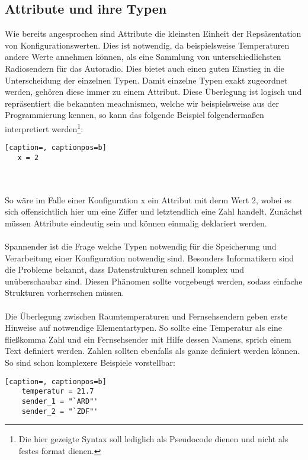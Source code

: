 \subsection{Attribute und ihre Typen}
Wie bereits angesprochen sind Attribute die kleinsten Einheit der Repsäsentation von Konfigurationswerten. Dies ist notwendig, da beispielsweise Temperaturen andere Werte annehmen können, als eine Sammlung von unterschiedlichsten Radiosendern für das Autoradio. Dies bietet auch einen guten Einstieg in die Unterscheidung der einzelnen Typen. Damit einzelne Typen exakt zugeordnet werden, gehören diese immer zu einem Attribut. Diese Überlegung ist logisch und repräsentiert die bekannten meachnismen, welche wir beispielsweise aus der Programmierung kennen, so kann das folgende Beispiel folgendermaßen interpretiert werden\footnote{Die hier gezeigte Syntax soll lediglich als Pseudocode dienen und nicht als festes format dienen.}:
\lstset{language=bash}
\begin{lstlisting}[caption=, captionpos=b]
   x = 2
\end{lstlisting}
	
\\\\

So wäre im Falle einer Konfiguration x ein Attribut mit derm Wert 2, wobei es sich offensichtlich hier um eine Ziffer und letztendlich eine Zahl handelt. Zunächst müssen Attribute eindeutig sein und können einmalig deklariert werden. 
\\\\
Spannender ist die Frage welche Typen notwendig für die  Speicherung und Verarbeitung einer Konfiguration notwendig sind. Besonders Informatikern sind die Probleme bekannt, dass Datenstrukturen schnell komplex und unüberschaubar sind. Diesen Phänomen sollte vorgebeugt werden, sodass einfache Strukturen vorherrschen müssen. 
\\\\
Die Überlegung zwischen Raumtemperaturen und Fernsehsendern geben erste Hinweise auf notwendige Elementartypen. So sollte eine Temperatur als eine fließkomma Zahl und ein Fernsehsender mit Hilfe dessen Namens, sprich einem Text definiert werden. Zahlen sollten ebenfalls als ganze definiert werden können. So sind schon komplexere Beispiele vorstellbar:
\lstset{language=bash}
\begin{lstlisting}[caption=, captionpos=b]
    temperatur = 21.7
	sender_1 = "`ARD"'
	sender_2 = "`ZDF"'
\end{lstlisting}


